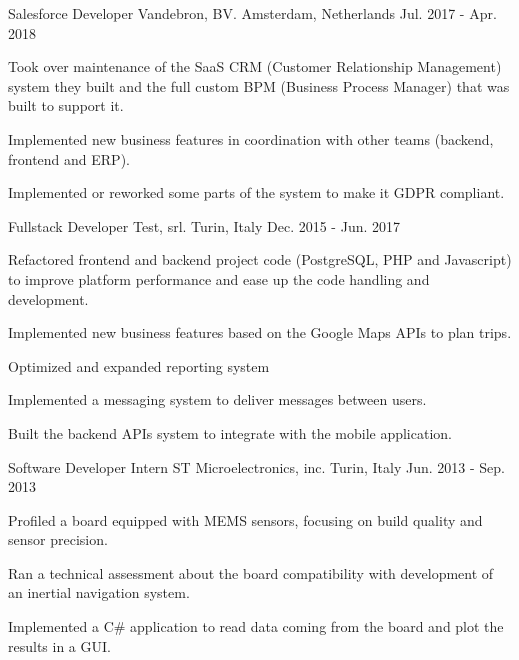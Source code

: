\begin{cventries}
  \cventry
    {Salesforce Developer} %
    {Vandebron, BV.} %
    {Amsterdam, Netherlands} %
    {Jul. 2017 - Apr. 2018} %
    {
      \begin{cvitems} %
        \item {Took over maintenance of the SaaS CRM (Customer Relationship Management) system they built and the full custom BPM (Business Process Manager) that was built to support it.}
        \item {Implemented new business features in coordination with other teams (backend, frontend and ERP).}
        \item {Implemented or reworked some parts of the system to make it GDPR compliant.}
      \end{cvitems}
    }

  \cventry
    {Fullstack Developer} %
    {Test, srl.} %
    {Turin, Italy} %
    {Dec. 2015 - Jun. 2017} %
    {
      \begin{cvitems} %
        \item {Refactored frontend and backend project code (PostgreSQL, PHP and Javascript) to improve platform performance and ease up the code handling and development.}
        \item {Implemented new business features based on the Google Maps APIs to plan trips.}
        \item {Optimized and expanded reporting system}
        \item {Implemented a messaging system to deliver messages between users.}
        \item {Built the backend APIs system to integrate with the mobile application.}
      \end{cvitems}
    }   

  \cventry
    {Software Developer Intern} %
    {ST Microelectronics, inc.} %
    {Turin, Italy} %
    {Jun. 2013 - Sep. 2013} %
    {
      \begin{cvitems} %
        \item {Profiled a board equipped with MEMS sensors, focusing on build quality and sensor precision.}
        \item {Ran a technical assessment about the board compatibility with development of an inertial navigation system.}
        \item {Implemented a C\# application to read data coming from the board and plot the results in a GUI.}
      \end{cvitems}
    }


\end{cventries}
